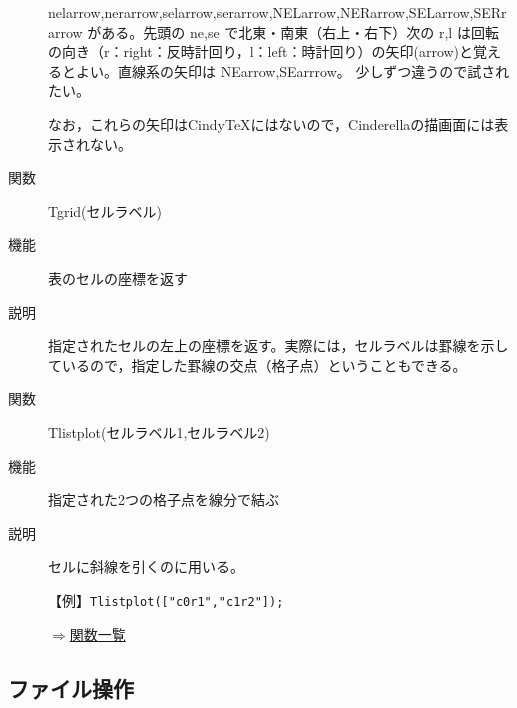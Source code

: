 \documentclass[papersize,a4paper,12pt,uplatex]{jsarticle}
\begin{document}
\begin{description}
nelarrow,nerarrow,selarrow,serarrow,NELarrow,NERarrow,SELarrow,SERrarrow がある。先頭の ne,se で北東・南東（右上・右下）次の r,l は回転の向き（r：right：反時計回り，l：left：時計回り）の矢印(arrow)と覚えるとよい。直線系の矢印は NEarrow,SEarrrow。 少しずつ違うので試されたい。

なお，これらの矢印はCindyTeXにはないので，Cinderellaの描画面には表示されない。


\vspace{\baselineskip}
\hypertarget{tgrid}{}
\item[関数]Tgrid(セルラベル)
\item[機能]表のセルの座標を返す
\item[説明]指定されたセルの左上の座標を返す。実際には，セルラベルは罫線を示しているので，指定した罫線の交点（格子点）ということもできる。

\vspace{\baselineskip}
\hypertarget{tlistplot}{}
\item[関数]Tlistplot(セルラベル1,セルラベル2)
\item[機能]指定された2つの格子点を線分で結ぶ
\item[説明]セルに斜線を引くのに用いる。

\vspace{\baselineskip}
【例】\verb|Tlistplot(["c0r1","c1r2"]);| 

\vspace{\baselineskip}
\begin{flushright}\hyperlink{functionlist}{$\Rightarrow$関数一覧}\end{flushright}

\end{description}

\subsection{ファイル操作}

\hypertarget{filemanip}{}
\end{document}
